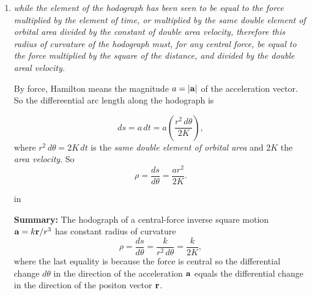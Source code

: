 \documentclass{ximera}
\newcommand{\pskip}{\vskip 0.1 in}
\begin{document}
\begin{enumerate}




 




\item \emph{while the element of the hodograph has been seen to be equal to the force multiplied by the element of time, or multiplied by the same double element of orbital area divided by the constant of double area velocity, therefore this radius of curvature of the hodograph must, for any central force, be equal to the force multiplied by the square of the distance, and divided by the double areal velocity.}

By force, Hamilton means the magnitude $a = |{\bf a}|$ of the acceleration vector. So the differeential arc length along the hodograph is

\[
  ds = a \, dt = a \left( \frac{r^2\, d\theta}{2K}\right),
\]
where $r^2\, d\theta = 2K \, dt$ is the \emph{same double element of orbital area} and $2K$ the \emph{area velocity}. So
\[
   \rho = \frac{ds}{d\theta} =  \frac{a r^2}{2K}.
\]

\pskip

{\bf Summary:} The hodograph of a central-force inverse square motion ${\bf a} = k{\bf r}/r^3$ has constant radius of curvature
\[
  \rho = \frac{ds}{d\theta} = \frac{k}{r^2 \, d\theta} = \frac{k}{2K},
\]
where the last equality is because the force is central so the differential change $d\theta$ in the direction of the acceleration ${\bf a}$ equals the differential change in the direction of the positon vector ${\bf r}$.

\end{enumerate}
\end{document}

